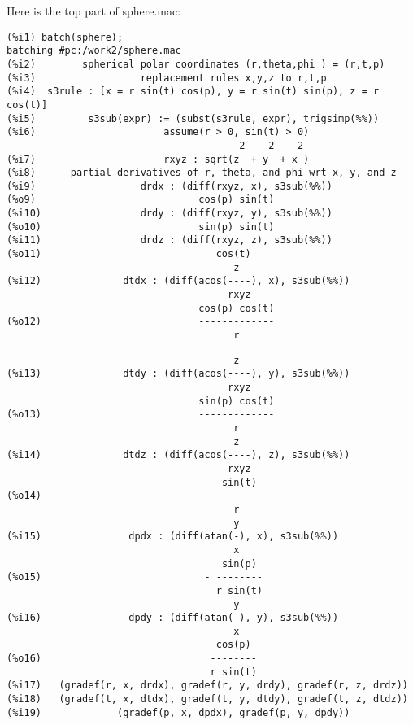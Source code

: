 \documentclass[12pt]{article}
\begin{document}
\smallskip
Here is the top part of sphere.mac:
\small
\begin{verbatim}
(%i1) batch(sphere);
batching #pc:/work2/sphere.mac
(%i2)        spherical polar coordinates (r,theta,phi ) = (r,t,p)  
(%i3)                  replacement rules x,y,z to r,t,p  
(%i4)  s3rule : [x = r sin(t) cos(p), y = r sin(t) sin(p), z = r cos(t)]
(%i5)         s3sub(expr) := (subst(s3rule, expr), trigsimp(%%))
(%i6)                      assume(r > 0, sin(t) > 0)
                                        2    2    2
(%i7)                      rxyz : sqrt(z  + y  + x )
(%i8)      partial derivatives of r, theta, and phi wrt x, y, and z 
(%i9)                  drdx : (diff(rxyz, x), s3sub(%%))
(%o9)                            cos(p) sin(t)
(%i10)                 drdy : (diff(rxyz, y), s3sub(%%))
(%o10)                           sin(p) sin(t)
(%i11)                 drdz : (diff(rxyz, z), s3sub(%%))
(%o11)                              cos(t)
                                       z
(%i12)              dtdx : (diff(acos(----), x), s3sub(%%))
                                      rxyz
                                 cos(p) cos(t)
(%o12)                           -------------
                                       r
\end{verbatim}
\newpage
\begin{verbatim}
                                       z
(%i13)              dtdy : (diff(acos(----), y), s3sub(%%))
                                      rxyz
                                 sin(p) cos(t)
(%o13)                           -------------
                                       r
                                       z
(%i14)              dtdz : (diff(acos(----), z), s3sub(%%))
                                      rxyz
                                     sin(t)
(%o14)                             - ------
                                       r
                                       y
(%i15)               dpdx : (diff(atan(-), x), s3sub(%%))
                                       x
                                     sin(p)
(%o15)                            - --------
                                    r sin(t)
                                       y
(%i16)               dpdy : (diff(atan(-), y), s3sub(%%))
                                       x
                                    cos(p)
(%o16)                             --------
                                   r sin(t)
(%i17)   (gradef(r, x, drdx), gradef(r, y, drdy), gradef(r, z, drdz))
(%i18)   (gradef(t, x, dtdx), gradef(t, y, dtdy), gradef(t, z, dtdz))
(%i19)             (gradef(p, x, dpdx), gradef(p, y, dpdy))
\end{verbatim}
\end{document}
